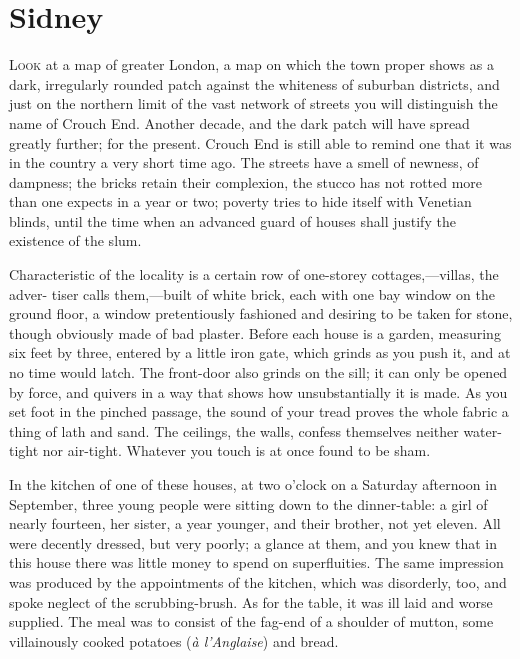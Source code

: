 \chapter{Sidney}

\textsc{Look} at a map of greater London, a map on which the town proper
shows as a dark, irregularly rounded patch against the whiteness of
suburban districts, and just on the northern limit of the vast network
of streets you will distinguish the name of Crouch End. Another decade,
and the dark patch will have spread greatly further; for the present.
Crouch End is still able to remind one that it was in the country a very
short time ago. The streets have a smell of newness, of dampness; the
bricks retain their complexion, the stucco has not rotted more than one
expects in a year or two; poverty tries to hide itself with Venetian
blinds, until the time when an advanced guard of houses shall justify
the existence of the slum.

Characteristic of the locality is a certain row of one-storey
cottages,---villas, the adver- {\protect\hypertarget{252}{}{}} tiser
calls them,---built of white brick, each with one bay window on the
ground floor, a window pretentiously fashioned and desiring to be taken
for stone, though obviously made of bad plaster. Before each house is a
garden, measuring six feet by three, entered by a little iron gate,
which grinds as you push it, and at no time would latch. The front-door
also grinds on the sill; it can only be opened by force, and quivers in
a way that shows how unsubstantially it is made. As you set foot in the
pinched passage, the sound of your tread proves the whole fabric a thing
of lath and sand. The ceilings, the walls, confess themselves neither
water-tight nor air-tight. Whatever you touch is at once found to be
sham.

In the kitchen of one of these houses, at two o'clock on a Saturday
afternoon in September, three young people were sitting down to the
dinner-table: a girl of nearly fourteen, her sister, a year younger, and
their brother, not yet eleven. All were decently dressed, but very
poorly; a glance at them, and you knew that in this house there was
little money to spend on superfluities. The same impression
{\protect\hypertarget{253}{}{}} was produced by the appointments of the
kitchen, which was disorderly, too, and spoke neglect of the
scrubbing-brush. As for the table, it was ill laid and worse supplied.
The meal was to consist of the fag-end of a shoulder of mutton, some
villainously cooked potatoes (\emph{à l'Anglaise}) and bread.

